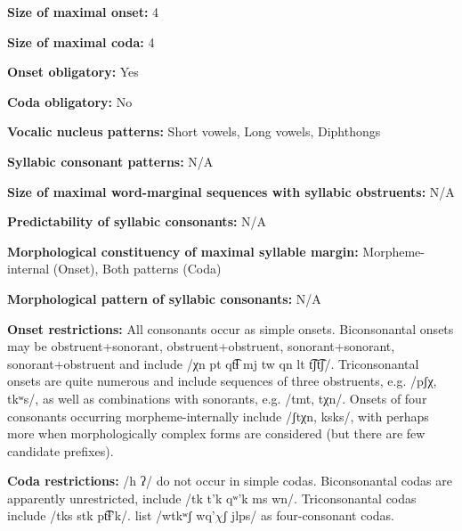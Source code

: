 \textbf{Size of maximal onset:} 4



\textbf{Size of maximal coda:} 4



\textbf{Onset obligatory:} Yes



\textbf{Coda obligatory:} No



\textbf{Vocalic nucleus patterns:} Short vowels, Long vowels, Diphthongs



\textbf{Syllabic consonant patterns:} N/A



\textbf{Size of maximal word{}-marginal sequences with syllabic obstruents:} N/A



\textbf{Predictability of syllabic consonants:} N/A



\textbf{Morphological constituency of maximal syllable margin:} Morpheme-internal (Onset), Both patterns (Coda)



\textbf{Morphological pattern of syllabic consonants:} N/A



\textbf{Onset restrictions:} All consonants occur as simple onsets. Biconsonantal onsets may be obstruent+sonorant, obstruent+obstruent, sonorant+sonorant, sonorant+obstruent and include /χn pt qt͡ɬ mj tw qn lt t͡ʃt͡ʃ/. Triconsonantal onsets are quite numerous and include sequences of three obstruents, e.g. /pʃχ, tkʷs/, as well as combinations with sonorants, e.g. /tmt, tχn/. Onsets of four consonants occurring morpheme-internally include /ʃtχn, ksks/, with perhaps more when morphologically complex forms are considered (but there are few candidate prefixes).



\textbf{Coda restrictions:} /h ʔ/ do not occur in simple codas. Biconsonantal codas are apparently unrestricted, include /tk t’k qʷ'k ms wn/. Triconsonantal codas include /tks stk pt͡ɬ’k/. \citet{HargusBeavert2006} list /wtkʷʃ wq’$\chi ʃ$ jlps/ as four-consonant codas.



